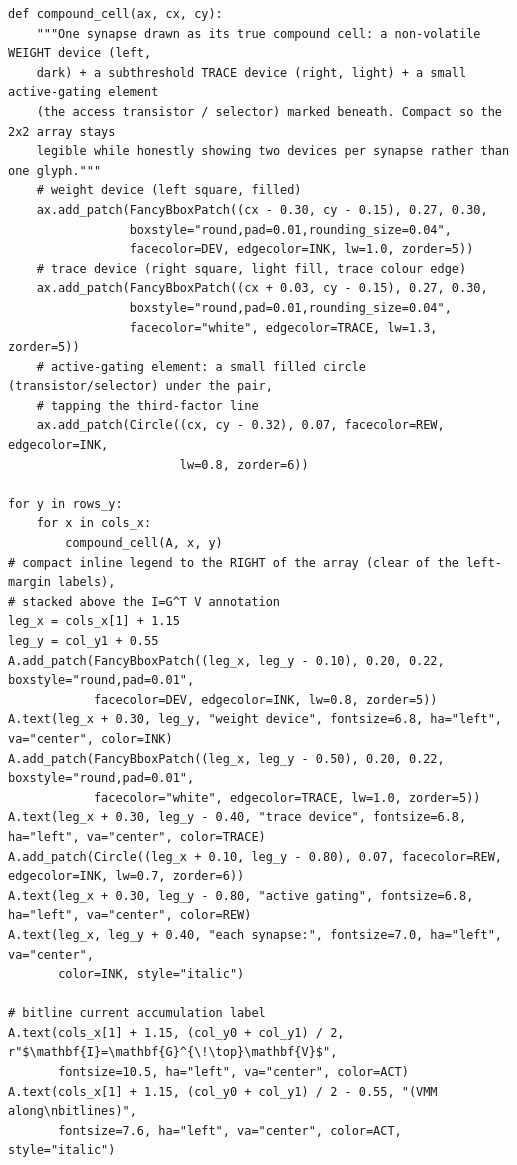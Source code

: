 \begin{lstlisting}[caption={schematics.ipynb code cell 7},label={lst:mrl-nb-schematics-7}]
def compound_cell(ax, cx, cy):
    """One synapse drawn as its true compound cell: a non-volatile WEIGHT device (left,
    dark) + a subthreshold TRACE device (right, light) + a small active-gating element
    (the access transistor / selector) marked beneath. Compact so the 2x2 array stays
    legible while honestly showing two devices per synapse rather than one glyph."""
    # weight device (left square, filled)
    ax.add_patch(FancyBboxPatch((cx - 0.30, cy - 0.15), 0.27, 0.30,
                 boxstyle="round,pad=0.01,rounding_size=0.04",
                 facecolor=DEV, edgecolor=INK, lw=1.0, zorder=5))
    # trace device (right square, light fill, trace colour edge)
    ax.add_patch(FancyBboxPatch((cx + 0.03, cy - 0.15), 0.27, 0.30,
                 boxstyle="round,pad=0.01,rounding_size=0.04",
                 facecolor="white", edgecolor=TRACE, lw=1.3, zorder=5))
    # active-gating element: a small filled circle (transistor/selector) under the pair,
    # tapping the third-factor line
    ax.add_patch(Circle((cx, cy - 0.32), 0.07, facecolor=REW, edgecolor=INK,
                        lw=0.8, zorder=6))

for y in rows_y:
    for x in cols_x:
        compound_cell(A, x, y)
# compact inline legend to the RIGHT of the array (clear of the left-margin labels),
# stacked above the I=G^T V annotation
leg_x = cols_x[1] + 1.15
leg_y = col_y1 + 0.55
A.add_patch(FancyBboxPatch((leg_x, leg_y - 0.10), 0.20, 0.22, boxstyle="round,pad=0.01",
            facecolor=DEV, edgecolor=INK, lw=0.8, zorder=5))
A.text(leg_x + 0.30, leg_y, "weight device", fontsize=6.8, ha="left", va="center", color=INK)
A.add_patch(FancyBboxPatch((leg_x, leg_y - 0.50), 0.20, 0.22, boxstyle="round,pad=0.01",
            facecolor="white", edgecolor=TRACE, lw=1.0, zorder=5))
A.text(leg_x + 0.30, leg_y - 0.40, "trace device", fontsize=6.8, ha="left", va="center", color=TRACE)
A.add_patch(Circle((leg_x + 0.10, leg_y - 0.80), 0.07, facecolor=REW, edgecolor=INK, lw=0.7, zorder=6))
A.text(leg_x + 0.30, leg_y - 0.80, "active gating", fontsize=6.8, ha="left", va="center", color=REW)
A.text(leg_x, leg_y + 0.40, "each synapse:", fontsize=7.0, ha="left", va="center",
       color=INK, style="italic")

# bitline current accumulation label
A.text(cols_x[1] + 1.15, (col_y0 + col_y1) / 2, r"$\mathbf{I}=\mathbf{G}^{\!\top}\mathbf{V}$",
       fontsize=10.5, ha="left", va="center", color=ACT)
A.text(cols_x[1] + 1.15, (col_y0 + col_y1) / 2 - 0.55, "(VMM along\nbitlines)",
       fontsize=7.6, ha="left", va="center", color=ACT, style="italic")


\end{lstlisting}
